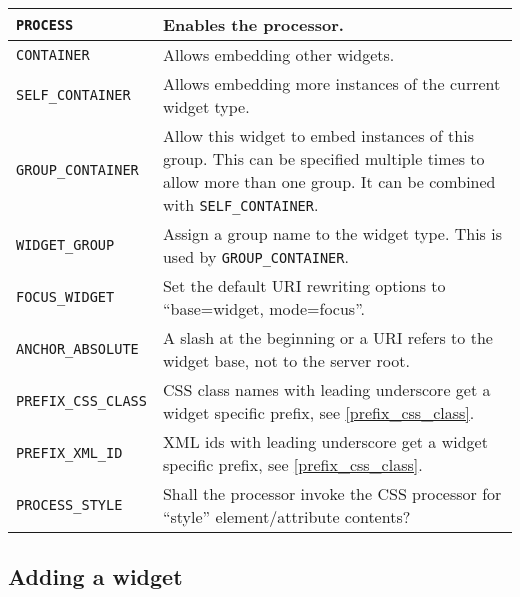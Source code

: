\documentclass[a4paper,12pt]{article}
\begin{document}
\begin{longtable}{|l|p{8cm}|}
\hline

\verb|PROCESS| & Enables the processor. \\

\hline

\verb|CONTAINER| & Allows embedding other widgets. \\

\hline

\verb|SELF_CONTAINER| & Allows embedding more instances of the current
widget type. \\

\hline

\verb|GROUP_CONTAINER| & Allow this widget to embed instances of this
group.  This can be specified multiple times to allow more than one
group.  It can be combined with \verb|SELF_CONTAINER|. \\

\hline

\verb|WIDGET_GROUP| & Assign a group name to the widget type.  This is
used by \verb|GROUP_CONTAINER|. \\

\hline

\texttt{FOCUS\_WIDGET} & Set the default URI rewriting options to
``base=widget, mode=focus''. \\

\hline

\verb|ANCHOR_ABSOLUTE| & A slash at the beginning or a URI refers to
the widget base, not to the server root. \\

\hline

\verb|PREFIX_CSS_CLASS| & CSS class names with leading underscore
get a widget specific prefix, see \ref{prefix_css_class}. \\

\hline

\verb|PREFIX_XML_ID| & XML ids with leading underscore get a widget
specific prefix, see \ref{prefix_css_class}. \\

\hline

\verb|PROCESS_STYLE| & Shall the processor invoke the CSS processor
for ``style'' element/attribute contents? \\

\hline
\end{longtable}


\subsection{Adding a widget}
\end{document}
